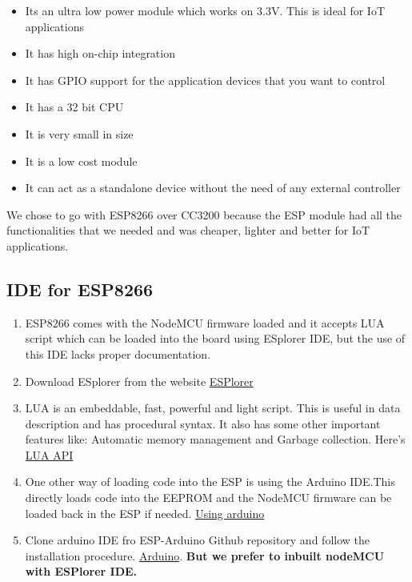 \documentclass[16pt]{article}
\begin{document}
\begin{itemize}

\item
  Its an ultra low power module which works on 3.3V. This is ideal for
  IoT applications
\item
  It has high on-chip integration
\item
  It has GPIO support for the application devices that you want to
  control
\item
  It has a 32 bit CPU
\item
  It is very small in size
\item
  It is a low cost module
\item
  It can act as a standalone device without the need of any external
  controller
\end{itemize}


\vspace{0.4cm}

We chose to go with ESP8266 over CC3200 because the ESP module had all
the functionalities that we needed and was cheaper, lighter and better
for IoT applications.




\subsection{IDE for ESP8266}

\begin{enumerate}

\item
  ESP8266 comes with the NodeMCU firmware loaded and it accepts LUA
  script which can be loaded into the board using ESplorer IDE, but the
  use of this IDE lacks proper documentation.
\item
  Download ESplorer from the website {\color{red}\href{http://esp8266.ru/esplorer/#download}{ESPlorer}}
\item
  LUA is an embeddable, fast, powerful and light script. This is useful in data
  description and has procedural syntax. It also has some other
  important features like: Automatic memory management and Garbage
  collection. Here's {\color{red}\href{http://www.lua.org/manual/5.3/}{LUA API}}
\item
  One other way of loading code into the ESP is using the Arduino
  IDE.This directly loads code into the EEPROM and the NodeMCU firmware
  can be loaded back in the ESP if
  needed. {\color{red}\href{https://learn.adafruit.com/adafruit-huzzah-esp8266-breakout/using-arduino-ide}{Using arduino}}
\item Clone arduino IDE fro ESP-Arduino Github repository and follow
  the installation procedure. {\color{red}\href{https://github.com/esp8266/Arduino.git}{Arduino}}. \textbf{But we prefer to inbuilt nodeMCU with ESPlorer IDE.}
\end{enumerate}
\end{document}
